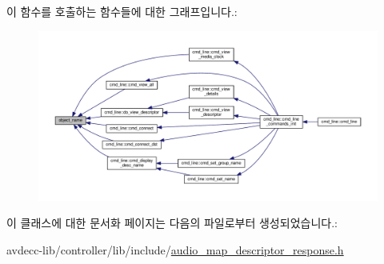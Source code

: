 이 함수를 호출하는 함수들에 대한 그래프입니다.\+:
\nopagebreak
\begin{figure}[H]
\begin{center}
\leavevmode
\includegraphics[width=350pt]{classavdecc__lib_1_1descriptor__response__base_a133f7774946d80f82b8aaaa4cfbb7361_icgraph}
\end{center}
\end{figure}




이 클래스에 대한 문서화 페이지는 다음의 파일로부터 생성되었습니다.\+:\begin{DoxyCompactItemize}
\item 
avdecc-\/lib/controller/lib/include/\hyperlink{audio__map__descriptor__response_8h}{audio\+\_\+map\+\_\+descriptor\+\_\+response.\+h}\end{DoxyCompactItemize}

